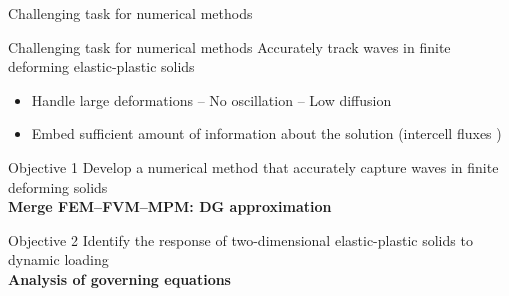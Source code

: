\begin{withoutheadline}
\begin{frame}{\text{  }}
\begin{overprint}
\begin{block}{Challenging task for numerical methods}
\begin{itemize}
        \end{itemize}
      \end{block}
      \vspace{-0.9cm}
      \begin{block}{}
        \centering
        
      \end{block}
      \vspace{-0.5cm}
      \begin{block}{Challenging task for numerical methods}
        \alert{Accurately track waves in finite deforming elastic-plastic solids}
        \begin{itemize}
        \item[1-] Handle large deformations -- No oscillation -- Low diffusion
        \item[2-] Embed sufficient amount of information about the solution (intercell fluxes \cite{Thomas_EP})
        \end{itemize}
      \end{block}

      \begin{block}{Objective 1}
        Develop a numerical method that accurately capture waves in finite deforming solids \\
        \textbf{Merge FEM--FVM--MPM: DG approximation}
      \end{block}
      \begin{block}{Objective 2}
      Identify the response of two-dimensional elastic-plastic solids to dynamic loading \\
      \textbf{Analysis of governing equations} %
    \end{block}
    
  \end{overprint}
\end{frame}
\end{withoutheadline}




